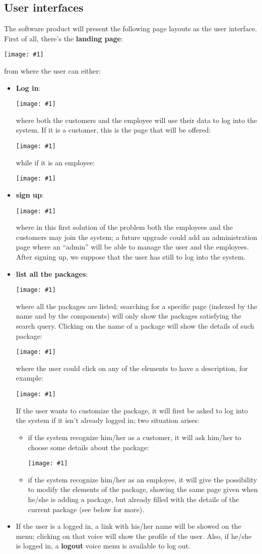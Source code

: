 \documentclass[a4paper,12pt]{book}
\newcommand{\putimg}[2]{
  \begin{center}
    \texttt{[image: \#1]}
  \end{center}
}
\begin{document}
\subsection{User interfaces}
The software product will present the following page layouts as the user interface. First of all, there's the \textbf{landing page}:
\putimg{landing}{0.4}
from where the user can either:
\begin{itemize}
  \item \textbf{Log in}:
  \putimg{login}{0.4}
  where both the customers and the employee will use their data to log into the system. If it is a customer, this is the page that will be offered:
  \putimg{customer}{0.4}
  while if it is an employee:
  \putimg{employee}{0.4}
  \item \textbf{sign up}:
  \putimg{signup}{0.4}
  where in this first solution of the problem both the employees and the customers may join the system; a future upgrade could add an administration page where an ``admin'' will be able to manage the user and the employees. After signing up, we suppose that the user has still to log into the system.
  \item \textbf{list all the packages}:
  \putimg{packages}{0.4}
  where all the packages are listed; searching for a specific page (indexed by the name and by the components) will only show the packages satisfying the search query. Clicking on the name of a package will show the details of such package:
  \putimg{package}{0.4}
  where the user could click on any of the elements to have a description, for example:
  \putimg{flight}{0.4}
  If the user wants to customize the package, it will first be asked to log into the system if it isn't already logged in; two situation arises:
  \begin{itemize}
    \item if the system recognize him/her as a customer, it will ask him/her to choose some details about the package:
    \putimg{customize}{0.4}
    \item if the system recognize him/her as an employee, it will give the possibility to modify the elements of the package, showing the same page given when he/she is adding a package, but already filled with the details of the current package (see below for more).
  \end{itemize}
  \item If the user is a logged in, a link with his/her name will be showed on the menu; clicking on that voice will show the profile of the user. Also, if he/she is logged in, a \textbf{logout} voice menu is available to log out.

\end{itemize}
\end{document}

